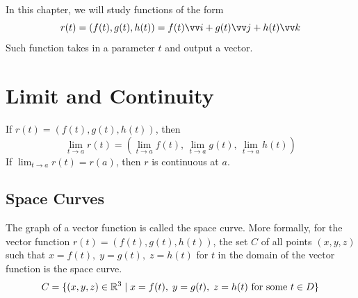 In this chapter, we will study functions of the form
$$
r(t) = \left(f(t),g(t),h(t)\right) = f(t)\vv i + g(t) \vv j + h(t) \vv k
$$
Such function takes in a parameter $t$ and output a vector.

\section{Limit and Continuity}

\begin{definition}
If $r(t) = (f(t),g(t),h(t))$, then
$$
\lim_{t\to a} r(t) = \left(\lim_{t\to a} f(t),\, \lim_{t\to a} g(t),\, \lim_{t\to a} h(t)\right)
$$
If $\lim_{t\to a} r(t) = r(a)$, then $r$ is continuous at $a$.
\end{definition}

\subsection{Space Curves}
The graph of a vector function is called the space curve. More formally, for the vector function $r(t)=(f(t),g(t),h(t))$, the set $C$ of all points $(x,y,z)$ such that $x=f(t),\; y=g(t),\;z=h(t)$ for $t$ in the domain of the vector function is the space curve.
$$
C = \{ (x,y,z) \in {\mathbb R}^3 \mid x=f(t),\; y=g(t),\;z=h(t) \text{ for some $t \in D$} \}
$$

